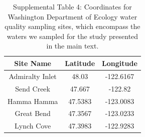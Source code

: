 \documentclass[fleqn,10pt]{wlpeerj}
\begin{document}
\begin{table}

\caption*{\label{tab:SupplTable_EcologySampling}Supplemental Table 4: Coordinates for Washington Department of Ecology water quality sampling sites, which encompass the waters we sampled for the study presented in the main text.}
\centering
\begin{tabular}[t]{c|c|c}
\hline
Site Name & Latitude & Longitude\\
\hline
Admiralty Inlet & 48.03 & -122.6167\\
\hline
Send Creek & 47.667 & -122.82\\
\hline
Hamma Hamma & 47.5383 & -123.0083\\
\hline
Great Bend & 47.3567 & -123.0233\\
\hline
Lynch Cove & 47.3983 & -122.9283\\
\hline
\end{tabular}
\end{table}
\end{document}
